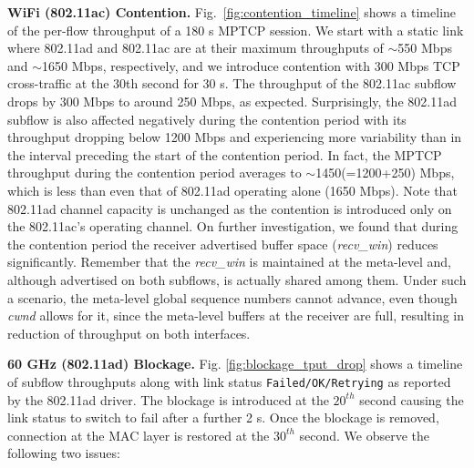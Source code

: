 \noindent\textbf{WiFi (802.11ac) Contention. } Fig.~\ref{fig:contention_timeline} shows a timeline of the
per-flow throughput of a 180 s MPTCP session. We start with a static link where 802.11ad and 802.11ac are 
at their maximum throughputs of $\sim$550 Mbps and $\sim$1650 Mbps, respectively, and we introduce
contention with 300 Mbps TCP cross-traffic at the 30th second for 30 s. The throughput of the 
802.11ac subflow drops by 300 Mbps to around 250 Mbps, as expected. Surprisingly, the 802.11ad subflow is also
affected negatively during the contention period with its throughput dropping below 1200 Mbps and experiencing more variability
than in the interval preceding the start of the contention period. In fact, the MPTCP throughput during the 
contention period averages to $\sim$1450(=1200+250) Mbps, which is less than even that of 802.11ad
operating alone (1650 Mbps). Note that 802.11ad channel capacity is unchanged as the contention is introduced 
only on the 802.11ac's operating channel. On further investigation, we found that during the
contention period the receiver advertised buffer space (\emph{recv\_win}) reduces significantly. 
Remember that the \emph{recv\_win} is maintained at the meta-level and, although
advertised on both subflows, is actually shared among them. Under such a scenario, the meta-level global sequence numbers
cannot advance, even though \emph{cwnd} allows for it, since the
meta-level buffers at the receiver are full, resulting in reduction of
throughput on both interfaces.


\begin{figure*}[t]
    \centering
    \hfill
    \hfill
    \vspace{-0.15in}
    \caption{\name}
    \vspace{-0.1in}
\end{figure*}
\fi

\noindent\textbf{60 GHz (802.11ad) Blockage. }
Fig. \ref{fig:blockage_tput_drop} shows a timeline of subflow
throughputs along with link status {\tt Failed/OK/Retrying} as
reported by the 802.11ad driver. The blockage is introduced at the
$20^{th}$ second causing the link status to switch to fail after a
further 2 s. Once the blockage is removed, connection at the MAC layer
is restored at the $30^{th}$ second. We observe the following two
issues:

